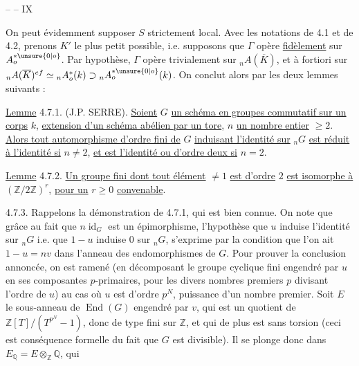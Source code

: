 \hfill --  -- \hfill IX

On peut évidemment supposer $S$ strictement local. Avec les notations de 4.1 et de 4.2, prenons $K'$ le plus petit possible, i.e. supposons que $\Gamma$ opère \uline{fidèlement} sur $A_o^{*\unsure{0|o}}$. Par hypothèse, $\Gamma$ opère trivialement sur ${}_nA(\overline K)$, et à fortiori sur ${}_nA(\overline K)^{ef}\simeq{}_nA_o^*(k)\supset{}_nA_o^{*\unsure{0|o}}(k)$. On conclut alors par les deux lemmes suivants :

\uline{Lemme} 4.7.1. (J.P. SERRE). \uline{Soient} $G$ \uline{un schéma en groupes commutatif sur un corps} $k$, \uline{extension d'un schéma abélien par un tore}, $n$ \uline{un nombre entier} $\geq2$. \uline{Alors tout automorphisme d'ordre fini de} $G$ \uline{induisant l'identité sur} ${}_nG$ \uline{est réduit à l'identité si} $n\neq2$, \uline{et est l'identité ou d'ordre deux si} $n=2$.

\uline{Lemme} 4.7.2. \uline{Un groupe fini dont tout élément} $\neq1$ \uline{est d'ordre} $2$ \uline{est isomorphe à} $(\mathbb Z/2\mathbb Z)^r$, \uline{pour un} $r\geq0$ \uline{convenable}.

4.7.3. Rappelons la démonstration de 4.7.1, qui est bien connue. On note que grâce au fait que $n\operatorname{id}_G$ est un épimorphisme, l'hypothèse que $u$ induise l'identité sur ${}_nG$ i.e. que $1-u$ induise $0$ sur ${}_nG$, s'exprime par la condition que l'on ait $1-u=nv$ dans l'anneau des endomorphismes de $G$. Pour prouver la conclusion annoncée, on est ramené (en décomposant le groupe cyclique fini engendré par $u$ en ses composantes $p$-primaires, pour les divers nombres premiers $p$ divisant l'ordre de $u$) au cas où $u$ est d'ordre $p^N$, puissance d'un nombre premier. Soit $E$ le sous-anneau de $\operatorname{End}(G)$ engendré par $v$, qui est un quotient de $\mathbb Z[T]/(T^{p^N}-1)$, donc de type fini sur $\mathbb Z$, et qui de plus est sans torsion (ceci est conséquence formelle du fait que $G$ est divisible). Il se plonge donc dans $E_{\mathbb Q}=E\otimes_{\mathbb Z}\mathbb Q$, qui
